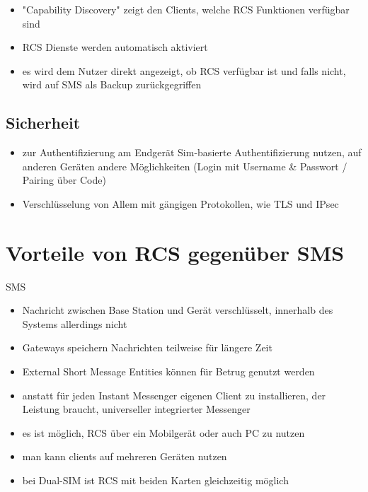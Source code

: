 \documentclass[conference]{IEEEtran}
\begin{document}
\begin{itemize}
    \item "Capability Discovery" zeigt den Clients, welche RCS Funktionen verfügbar sind
    \item RCS Dienste werden automatisch aktiviert
    \item es wird dem Nutzer direkt angezeigt, ob RCS verfügbar ist und falls nicht, wird auf SMS als Backup zurückgegriffen
\end{itemize}
\cite{uniprof}

\subsection{Sicherheit}

\begin{itemize}
    \item zur Authentifizierung am Endgerät Sim-basierte Authentifizierung nutzen, auf anderen Geräten andere Möglichkeiten (Login mit Username \& Passwort / Pairing über Code)
    \item Verschlüsselung von Allem mit gängigen Protokollen, wie TLS und IPsec
\end{itemize}
\cite{uniprof}

\section{Vorteile von RCS gegenüber SMS}

SMS

\begin{itemize}
    \item Nachricht zwischen Base Station und Gerät verschlüsselt, innerhalb des Systems allerdings nicht
    \item Gateways speichern Nachrichten teilweise für längere Zeit
    \item External Short Message Entities können für Betrug genutzt werden
\end{itemize}
\cite{sendoutsms}

\begin{itemize}
    \item anstatt für jeden Instant Messenger eigenen Client zu installieren, der Leistung braucht, universeller integrierter Messenger
    \item es ist möglich, RCS über ein Mobilgerät oder auch PC zu nutzen
\end{itemize}
\cite{rcsmno}

\begin{itemize}
    \item man kann clients auf mehreren Geräten nutzen
    \item bei Dual-SIM ist RCS mit beiden Karten gleichzeitig möglich
\end{itemize}
\cite{uniprof}
\end{document}
